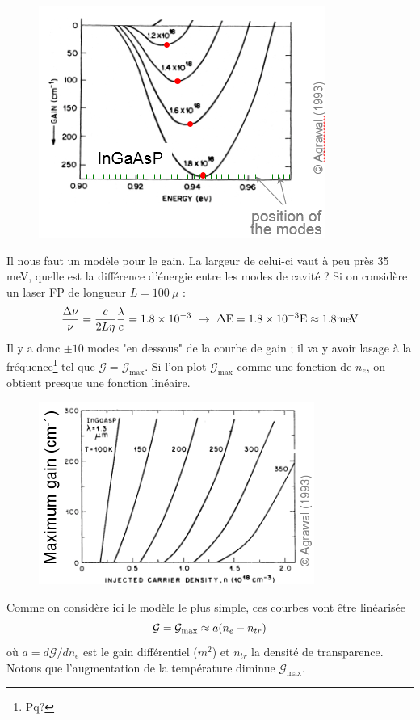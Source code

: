 	\begin{figure}
	\vspace{-5mm}
	\includegraphics[scale=0.6]{ch5/image46}
	\end{figure}	
	Il nous faut un modèle pour le gain. La largeur de celui-ci vaut à peu près 35 meV, quelle
	est la différence d'énergie entre les modes de cavité ? Si on considère un laser FP de longueur
	$L=100\ \mu$ :
	\begin{equation}
	\frac{{\Delta \nu }}{\nu } = \frac{c}{{2L\eta }}\frac{\lambda }{c} = 1.8 \times {10^{ - 3}}\ 
	\to\  \Delta {\rm{E}} = 1.8 \times {10^{ - 3}}{\rm{E}} \approx 1.8{\rm{ meV}}
	\end{equation}
	Il y a donc $\pm10$ modes "en dessous" de la courbe de gain ; il va y avoir lasage à la 
	fréquence\footnote{Pq?}	tel que $\mathcal{G} = \mathcal{G}_\text{max}$. Si l'on plot 
	$\mathcal{G}_\text{max}$ comme	une fonction de $n_e$, on obtient presque une fonction linéaire.\\
	
	\begin{figure}
	\vspace{-5mm}
	\includegraphics[scale=0.6]{ch5/image47}
	\end{figure}	
	Comme on considère ici le modèle le plus simple, ces courbes vont être linéarisée
	\begin{equation}
	{{\cal G}} = {{{\cal G}}_{\max }} \approx a({n_e} - {n_{tr}})
	\end{equation}
	où $a = d\mathcal{G}/dn_e$ est le gain différentiel ($m^2$) et $n_{tr}$ la densité de 
	transparence. Notons que l'augmentation de la température diminue $\mathcal{G}_{\text{max}}$.\\
	
